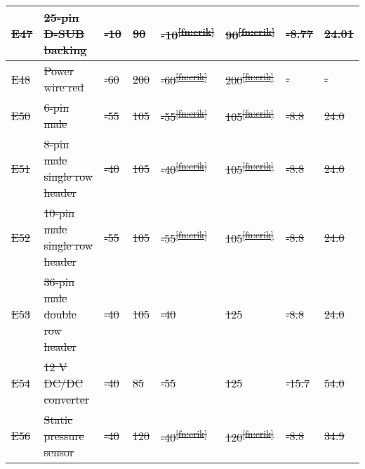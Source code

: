 \begin{longtable}{|m{1cm}|m{3.5cm}|m{1.3cm}|m{1.3cm}|m{1.4cm}|m{1.3cm}|m{2.0cm}|m{1.6cm}|}
\color{red}\st{E47} & \color{red}\st{25-pin D-SUB backing} & \color{red}\st{-10} & \color{red}\st{90} & \color{red}\st{-10\textsuperscript{\ref{fn:erik}}} & \color{red}\st{90\textsuperscript{\ref{fn:erik}}} & \color{red}\st{-8.77} & \color{red}\st{24.01} \\ \hline
\color{red}\st{E48} & \color{red}\st{Power wire red} & \color{red}\st{-60} & \color{red}\st{200} & \color{red}\st{-60\textsuperscript{\ref{fn:erik}}} & \color{red}\st{200\textsuperscript{\ref{fn:erik}}} & \color{red}\st{-} & \color{red}\st{-}  \\ \hline
\color{red}\st{E50} & \color{red}\st{6-pin male} & \color{red}\st{-55} & \color{red}\st{105} & \color{red}\st{-55\textsuperscript{\ref{fn:erik}}} & \color{red}\st{105\textsuperscript{\ref{fn:erik}}} & \color{red}\st{-8.8} & \color{red}\st{24.0}  \\ \hline
\color{red}\st{E51} & \color{red}\st{8-pin male single row header}& \color{red}\st{-40} & \color{red}\st{105} & \color{red}\st{-40\textsuperscript{\ref{fn:erik}}} & \color{red}\st{105\textsuperscript{\ref{fn:erik}}} & \color{red}\st{-8.8} & \color{red}\st{24.0}  \\ \hline
\color{red}\st{E52} & \color{red}\st{10-pin male single row header} & \color{red}\st{-55} & \color{red}\st{105} & \color{red}\st{-55\textsuperscript{\ref{fn:erik}}} & \color{red}\st{105\textsuperscript{\ref{fn:erik}}} & \color{red}\st{-8.8} & \color{red}\st{24.0}  \\ \hline
\color{red}\st{E53} & \color{red}\st{36-pin male double row header} & \color{red}\st{-40} & \color{red}\st{105} & \color{red}\st{-40} & \color{red}\st{125} & \color{red}\st{-8.8} & \color{red}\st{24.0}  \\ \hline
\color{red}\st{E54} & \color{red}\st{12 V DC/DC converter} & \color{red}\st{-40} & \color{red}\st{85} & \color{red}\st{-55} & \color{red}\st{125} & \color{red}\st{-15.7} & \color{red}\st{54.0}  \\ \hline
\color{red}\st{E56} & \color{red}\st{Static pressure sensor} & \color{red}\st{-40} & \color{red}\st{120} & \color{red}\st{-40\textsuperscript{\ref{fn:erik}}} & \color{red}\st{120\textsuperscript{\ref{fn:erik}}} & \color{red}\st{-8.8} & \color{red}\st{34.9} \\ \hline

\end{longtable}
